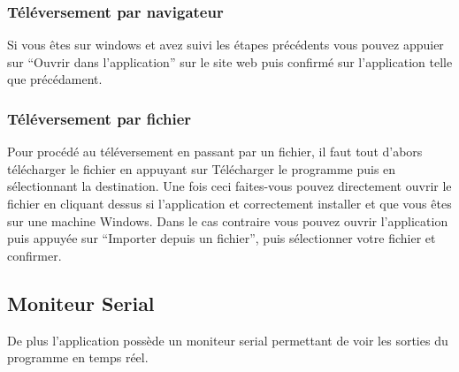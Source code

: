         \subsubsection{Téléversement par navigateur}

            Si vous êtes sur windows et avez suivi les étapes précédents vous pouvez appuier sur ``Ouvrir dans l'application''
            sur le site web puis confirmé sur l'application telle que précédament.

        \subsubsection{Téléversement par fichier}

            Pour procédé au téléversement en passant par un fichier, il faut tout d'abors télécharger le fichier
            en appuyant sur Télécharger le programme puis en sélectionnant la destination.
            Une fois ceci faites-vous pouvez directement ouvrir le fichier en cliquant dessus si l'application
            et correctement installer et que vous êtes sur une machine Windows.
            Dans le cas contraire vous pouvez ouvrir l'application puis appuyée sur ``Importer depuis un fichier'',
            puis sélectionner votre fichier et confirmer.

        \subsection{Moniteur Serial}\label{subsec:moniteur-serial}

            De plus l'application possède un moniteur serial permettant de voir les sorties du programme en temps réel.

